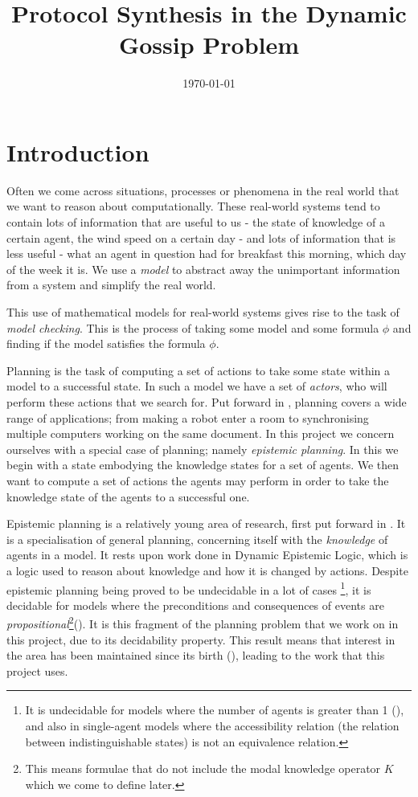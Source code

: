 \documentclass[10pt, a4paper]{report}
\title{Protocol Synthesis in the Dynamic Gossip Problem} %
\author{
	\authorstyle{Leo Poulson}
	\newline\newline %
}
\date{\today}
\begin{document}
\maketitle
\thispagestyle{firstpage}

\tableofcontents
\newpage

\chapter{Introduction}
\label{sec:Introduction}

Often we come across situations, processes or phenomena in the real world that
we want to reason about computationally. These real-world systems tend to
contain lots of information that are useful to us - the state of knowledge of a
certain agent, the wind speed on a certain day - and lots of information that is
less useful - what an agent in question had for breakfast this morning, which
day of the week it is. We use a \emph{model} to abstract away the unimportant
information from a system and simplify the real world. 

This use of mathematical models for real-world systems gives rise to the task of
\emph{model checking}. This is the process of taking some model  and some
formula $\phi$ and finding if the model  satisfies the formula $\phi$.

Planning is the task of computing a set of actions to take some state within a
model to a successful state. In such a model we have a set of \emph{actors}, who
will perform these actions that we search for. Put forward in
\cite{PlanningBook}, planning covers a wide range of applications; from making a
robot enter a room to synchronising multiple computers working on the same
document. In this project we concern ourselves with a special case of planning;
namely \emph{epistemic planning}. In this we begin with a state embodying the
knowledge states for a set of agents. We then want to compute a set of actions
the agents may perform in order to take the knowledge state of the agents to a
successful one.

Epistemic planning is a relatively young area of research, first put forward in
\cite{BolanderEP}. It is a specialisation of general planning, concerning itself
with the \emph{knowledge} of agents in a model. It rests upon work done in
Dynamic Epistemic Logic, which is a logic used to reason about knowledge and how
it is changed by actions. Despite epistemic planning being proved to be
undecidable in a lot of cases \footnote{It is undecidable for models where the
  number of agents is greater than 1 (\cite{UndecidabilityEP}), and also in
  single-agent models where the accessibility relation (the relation between
  indistinguishable states) is not an equivalence relation.}, it is decidable
for models where the preconditions and consequences of events are
\emph{propositional}\footnote{This means formulae that do not include the modal
  knowledge operator $K$ which we come to define later.}(\cite{DecidabilityEp}).
It is this fragment of the planning problem that we work on in this project, due
to its decidability property. This result means that interest in the area has
been maintained since its birth (\cite{AutomataTechniques}), leading to the work
that this project uses.
\end{document}
